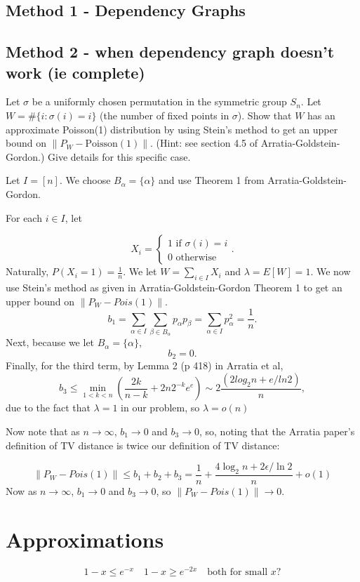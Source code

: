 \documentclass{article}
\newcommand{\answer}[1]{%
  \begin{tcolorbox}[
    colback=gray!9.8,
    boxrule=0.5pt,
    breakable]
  \small #1
  \end{tcolorbox}}
\begin{document}
\subsection{Method 1 - Dependency Graphs}

\subsection{Method 2 - when dependency graph doesn't work (ie complete)}

\begin{example}
    Let $\sigma$ be a uniformly chosen permutation in the symmetric group $S_n$. Let $W = \#\{i : \sigma(i) = i\}$ (the number of fixed points in $\sigma$). Show that $W$ has an approximate Poisson(1) distribution by using Stein's method to get an upper bound on $\|P_W - \text{Poisson}(1)\|$. (Hint: see section 4.5 of Arratia-Goldstein-Gordon.) Give details for this specific case.

\answer{
Let $I = [n]$. We choose $B_\alpha = \{\alpha\}$ and use Theorem 1 from Arratia-Goldstein-Gordon. 

For each $i\in I$, let

$$X_i = \begin{cases}
    1 \text{ if } \sigma(i) = i\\
    0 \text{ otherwise}
\end{cases}.$$
Naturally, $P(X_i =1) = \frac{1}{n}$. We let $W = \sum_{i\in I} X_i$ and $\lambda = E[W] = 1$. We now use Stein's method as given in Arratia-Goldstein-Gordon Theorem 1 to get an upper bound on $\lVert P_W - Pois(1)\rVert$.
$$b_1 = \sum_{\alpha\in I} \sum_{\beta \in B_\alpha} p_\alpha p_\beta = \sum_{\alpha \in I} p_\alpha^2 = \frac{1}{n}.$$
Next, because we let $B_\alpha = \{\alpha\}$, 
$$b_2 = 0.$$
Finally, for the third term, by Lemma 2 (p 418) in Arratia et al,
$$b_3 \leq \min_{1<k<n} (\frac{2k}{n-k} + 2n 2^{-k} e^{e})\sim 2\frac{(2log_2 n + e/ln 2)}{n},$$
due to the fact that $\lambda=1$ in our problem, so $\lambda = o(n)$

Now note that as $n\to \infty$, $b_1\to 0$ and $b_3\to 0$, so, noting that the Arratia paper's definition of TV distance is twice our definition of TV distance:

$$\lVert P_W - Pois(1)\rVert\leq b_1 + b_2 + b_3 = \frac{1}{n} + \frac{4\log_2 n + 2\epsilon/\ln 2}{n} + o(1)$$
Now as $n\to \infty$, $b_1 \to 0$ and $b_3 \to 0$, so $\lVert P_W - Pois(1)\rVert \to 0$. 
}
\end{example}

\begin{example}
    
\end{example}



\newpage 
\section{Approximations}
$$1-x \leq e^{-x} \quad 1-x\geq e^{-2x} \quad \text{both for small } x?$$  
\end{document}
